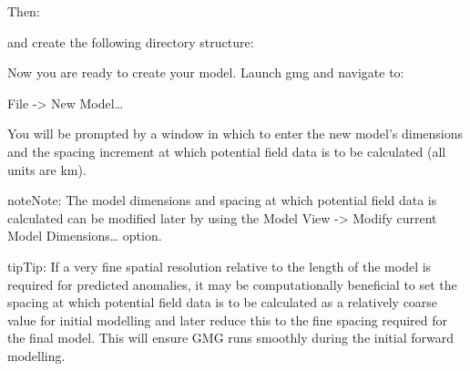 \documentclass[a4paper,12pt,english]{sphinxmanual}
\begin{document}
\begin{sphinxVerbatim}[commandchars=\\\{\}]
 
\end{sphinxVerbatim}

Then:

\begin{sphinxVerbatim}[commandchars=\\\{\}]
 
\end{sphinxVerbatim}

and create the following directory structure:

\begin{sphinxVerbatim}[commandchars=\\\{\}]
         
\end{sphinxVerbatim}

Now you are ready to create your model. Launch gmg and navigate to:

File -\textgreater{} New Model…

You will be prompted by a window in which to enter the new model’s dimensions and the spacing
increment at which potential field data is to be calculated (all units are km).

\begin{sphinxadmonition}{note}{Note:}
The model dimensions and spacing at which potential field data is calculated can be modified later by using the
Model View -\textgreater{} Modify current Model Dimensions… option.
\end{sphinxadmonition}

\begin{sphinxadmonition}{tip}{Tip:}
If a very fine spatial resolution relative to the length of the model is required for predicted anomalies, it may
be computationally beneficial to set the  spacing at which potential field data is to be calculated as a relatively
coarse value for initial modelling and later reduce this to the fine spacing required for the final model. This will
ensure GMG runs smoothly during the initial forward modelling.
\end{sphinxadmonition}

\begin{DUlineblock}{0em}
\item[] 
\end{DUlineblock}
\end{document}
